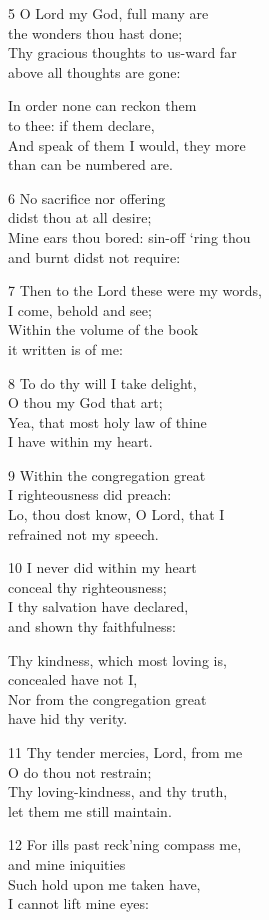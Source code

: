 5 O Lord my God, full many are\\
the wonders thou hast done;\\
Thy gracious thoughts to us-ward far\\
above all thoughts are gone:

In order none can reckon them\\
to thee: if them declare,\\
And speak of them I would, they more\\
than can be numbered are.

6 No sacrifice nor offering\\
didst thou at all desire;\\
Mine ears thou bored: sin-off ‘ring thou\\
and burnt didst not require:

7 Then to the Lord these were my words,\\
I come, behold and see;\\
Within the volume of the book\\
it written is of me:

8 To do thy will I take delight,\\
O thou my God that art;\\
Yea, that most holy law of thine\\
I have within my heart.

9 Within the congregation great\\
I righteousness did preach:\\
Lo, thou dost know, O Lord, that I\\
refrained not my speech.

10 I never did within my heart\\
conceal thy righteousness;\\
I thy salvation have declared,\\
and shown thy faithfulness:

Thy kindness, which most loving is,\\
concealed have not I,\\
Nor from the congregation great\\
have hid thy verity.

11 Thy tender mercies, Lord, from me\\
O do thou not restrain;\\
Thy loving-kindness, and thy truth,\\
let them me still maintain.

12 For ills past reck’ning compass me,\\
and mine iniquities\\
Such hold upon me taken have,\\
I cannot lift mine eyes:

